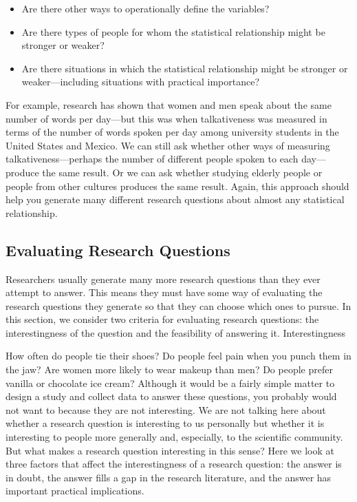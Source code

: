 \begin{itemize}
\item Are there other ways to operationally define the variables?
\item Are there types of people for whom the statistical relationship might be stronger or weaker?
\item Are there situations in which the statistical relationship might be stronger or weaker---including
situations with practical importance?
\end{itemize}

For example, research has shown that women and men speak about the same number of words per day---but this was when talkativeness was measured in terms of the number of words spoken per day among university students in the United States and Mexico. We can still ask whether other ways of measuring talkativeness---perhaps the number of different people spoken to each day---produce the same result. Or we can ask whether studying elderly people or people from other cultures produces the same result. Again, this approach should help you generate many different research questions about almost any statistical relationship.

\subsection{Evaluating Research Questions}
Researchers usually generate many more research questions than they ever attempt to answer. This means they must have some way of evaluating the research questions they generate so that they can choose which ones to pursue. In this section, we consider two criteria for evaluating research questions: the interestingness of the question and the feasibility of answering it.
Interestingness

How often do people tie their shoes? Do people feel pain when you punch them in the jaw? Are women more likely to wear makeup than men? Do people prefer vanilla or chocolate ice cream? Although it would be a fairly simple matter to design a study and collect data to answer these questions, you probably would not want to because they are not interesting. We are not talking here about whether a research question is interesting to us personally but whether it is interesting to people more generally and, especially, to the scientific community. But what makes a research question interesting in this sense? Here we look at three factors that affect the interestingness of a research question: the answer is in doubt, the answer fills a gap in the research literature, and the answer has important practical implications.

